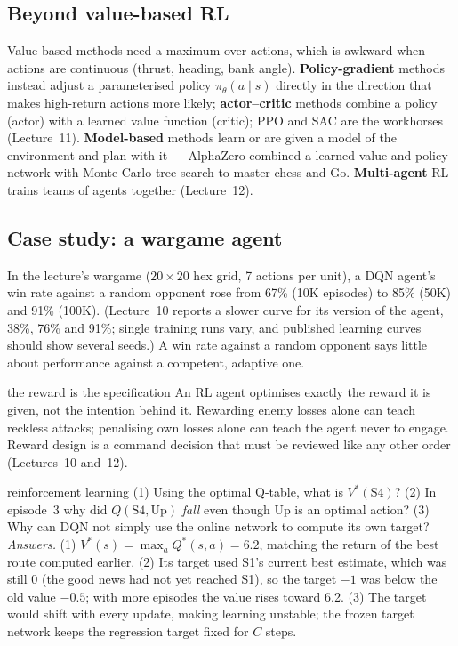 \documentclass[11pt]{article}
\begin{document}
\subsection{Beyond value-based RL}
Value-based methods need a maximum over actions, which is awkward when actions are continuous (thrust, heading, bank angle). \textbf{Policy-gradient} methods instead adjust a parameterised policy $\pi_\theta(a\mid s)$ directly in the direction that makes high-return actions more likely; \textbf{actor--critic} methods combine a policy (actor) with a learned value function (critic); PPO and SAC are the workhorses (Lecture~11). \textbf{Model-based} methods learn or are given a model of the environment and plan with it --- AlphaZero combined a learned value-and-policy network with Monte-Carlo tree search to master chess and Go. \textbf{Multi-agent} RL trains teams of agents together (Lecture~12).

\subsection{Case study: a wargame agent}
In the lecture's wargame ($20\times20$ hex grid, 7 actions per unit), a DQN agent's win rate against a random opponent rose from 67\% (10K episodes) to 85\% (50K) and 91\% (100K). (Lecture~10 reports a slower curve for its version of the agent, 38\%, 76\% and 91\%; single training runs vary, and published learning curves should show several seeds.) A win rate against a random opponent says little about performance against a competent, adaptive one.
\begin{pitfall}{the reward is the specification}
An RL agent optimises exactly the reward it is given, not the intention behind it. Rewarding enemy losses alone can teach reckless attacks; penalising own losses alone can teach the agent never to engage. Reward design is a command decision that must be reviewed like any other order (Lectures~10 and~12).
\end{pitfall}
\begin{question}{reinforcement learning}
(1) Using the optimal Q-table, what is $V^*(\text{S4})$? (2) In episode~3 why did $Q(\text{S4},\text{Up})$ \emph{fall} even though Up is an optimal action? (3) Why can DQN not simply use the online network to compute its own target?\\
\textit{Answers.} (1) $V^*(s)=\max_aQ^*(s,a)=6.2$, matching the return of the best route computed earlier. (2) Its target used S1's current best estimate, which was still 0 (the good news had not yet reached S1), so the target $-1$ was below the old value $-0.5$; with more episodes the value rises toward 6.2. (3) The target would shift with every update, making learning unstable; the frozen target network keeps the regression target fixed for $C$ steps.
\end{question}
\end{document}

